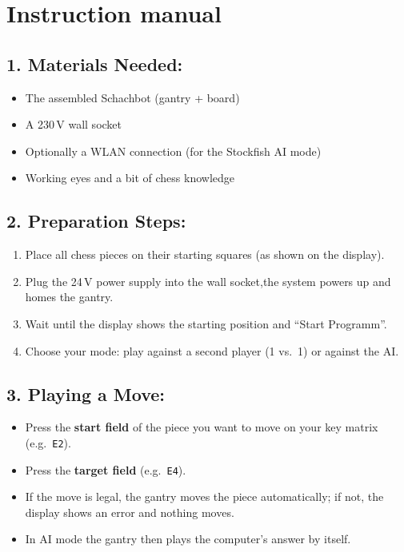 \documentclass[10pt]{article}
\begin{document}
\newpage

\section{Instruction manual}

\subsection{1. Materials Needed:}
\begin{itemize}
    \item The assembled Schachbot (gantry + board)
    \item A 230\,V wall socket
    \item Optionally a WLAN connection (for the Stockfish AI mode)
    \item Working eyes and a bit of chess knowledge
\end{itemize}

\subsection{2. Preparation Steps:}
\begin{enumerate}
    \item Place all chess pieces on their starting squares (as shown on the display).
    \item Plug the 24\,V power supply into the wall socket,the system powers up and homes the gantry.
    \item Wait until the display shows the starting position and ``Start Programm''.
    \item Choose your mode: play against a second player (1 vs.\ 1) or against the AI.
\end{enumerate}

\subsection{3. Playing a Move:}
\begin{itemize}
    \item Press the \textbf{start field} of the piece you want to move on your key matrix (e.g.\ \texttt{E2}).
    \item Press the \textbf{target field} (e.g.\ \texttt{E4}).
    \item If the move is legal, the gantry moves the piece automatically; if not, the display shows an error and nothing moves.
    \item In AI mode the gantry then plays the computer's answer by itself.
\end{itemize}
\end{document}
